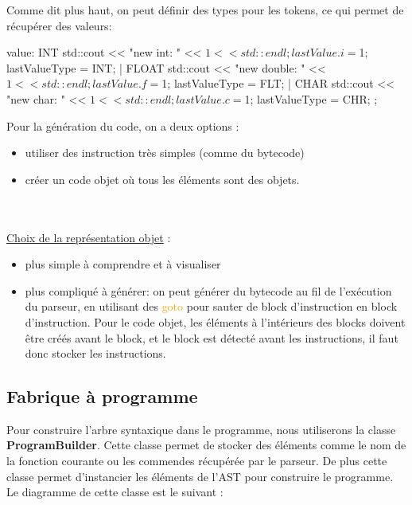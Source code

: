 \documentclass[a4paper]{article}%
\begin{document}
Comme dit plus haut, on peut définir des types pour les tokens, ce qui permet de
récupérer des valeurs:

\begin{code}[language=c++]
value: INT {
       std::cout << "new int: " << $1 << std::endl;
       lastValue.i = $1;
       lastValueType = INT;
     } | FLOAT {
       std::cout << "new double: " << $1 << std::endl;
       lastValue.f = $1;
       lastValueType = FLT;
     } | CHAR {
       std::cout << "new char: " << $1 << std::endl;
       lastValue.c = $1;
       lastValueType = CHR;
     }
     ;
\end{code}\leavevmode\newline

Pour la génération du code, on a deux options :
\begin{itemize}
  \item utiliser des instruction très simples (comme du \gls{bytecode})
\item créer un code objet où tous les éléments sont des objets.
\end{itemize}\leavevmode\\~\\

\underline{Choix de la représentation objet} :
\begin{itemize}
\item plus simple à comprendre et à visualiser
\item plus compliqué à générer: on peut générer du bytecode au fil de l'exécution du parseur, en utilisant des \textcolor{orange}{goto} pour sauter de block d'instruction en block d'instruction. Pour le code objet, les éléments à l'intérieurs des blocks doivent être créés avant le block, et le block est détecté avant les instructions, il faut donc stocker les instructions.
\end{itemize}


\clearpage{}

\subsection{Fabrique à programme}

Pour construire l'arbre syntaxique dans le programme, nous utiliserons
la classe \textbf{ProgramBuilder}. Cette classe permet de stocker des éléments
comme le nom de la fonction courante ou les commendes récupérée par le parseur.
De plus cette classe permet d'instancier les éléments de l'AST pour construire
le programme. Le diagramme de cette classe est le suivant :
\end{document}
